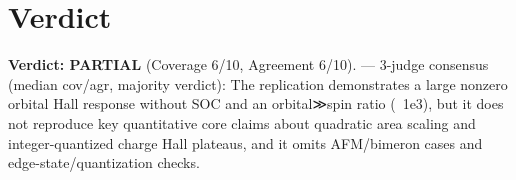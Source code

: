 \documentclass[11pt]{article}
\begin{document}
\section{Verdict}
\textbf{Verdict: PARTIAL} (Coverage 6/10, Agreement 6/10). — 3-judge consensus (median cov/agr, majority verdict): The replication demonstrates a large nonzero orbital Hall response without SOC and an orbital≫spin ratio (~1e3), but it does not reproduce key quantitative core claims about quadratic area scaling and integer-quantized charge Hall plateaus, and it omits AFM/bimeron cases and edge-state/quantization checks.
\end{document}
